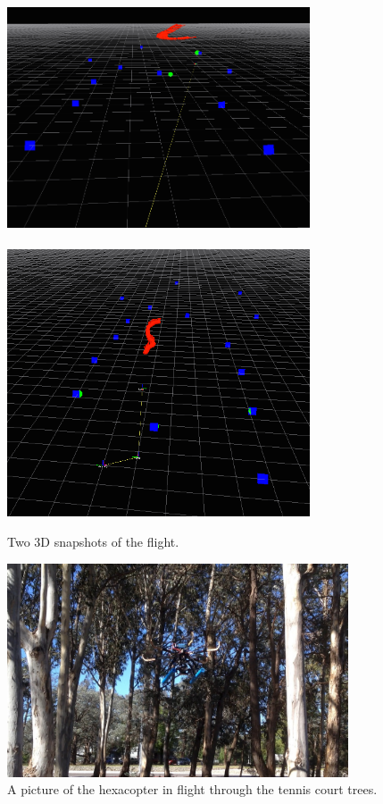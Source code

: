 \documentclass[12pt,oneside,a4paper]{book}
\begin{document}
\begin{figure}
  \centering
  \includegraphics[width=0.8\textwidth]{figs/tennis-flying-1}\\~\\
  \includegraphics[width=0.8\textwidth]{figs/tennis-flying-2}
  \caption{Two 3D snapshots of the flight.}
  \label{fig:flying-tennis-3D}
\end{figure}

\begin{figure}
  \centering
  \includegraphics[width=0.9\textwidth]{figs/tennis-flying-pic}
  \caption{A picture of the hexacopter in flight through the tennis court trees.}
  \label{fig:flying-tennis-pic}
\end{figure}
\end{document}
